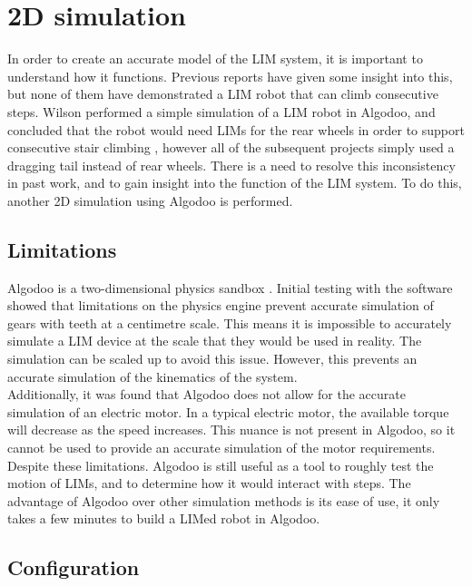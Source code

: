 \chapter{2D simulation}

In order to create an accurate model of the LIM system, it is important to understand how it functions. Previous reports have given some insight into this, but none of them have demonstrated a LIM robot that can climb consecutive steps. Wilson performed a simple simulation of a LIM robot in Algodoo, and concluded that the robot would need LIMs for the rear wheels in order to support consecutive stair climbing \citep{Wilson-2013}, however all of the subsequent projects simply used a dragging tail instead of rear wheels. There is a need to resolve this inconsistency in past work, and to gain insight into the function of the LIM system. To do this, another 2D simulation using Algodoo is performed.

\section{Limitations}

Algodoo is a two-dimensional physics sandbox \citep{Algodoo}. Initial testing with the software showed that limitations on the physics engine prevent accurate simulation of gears with teeth at a centimetre scale. This means it is impossible to accurately simulate a LIM device at the scale that they would be used in reality. The simulation can be scaled up to avoid this issue. However, this prevents an accurate simulation of the kinematics of the system.\\

Additionally, it was found that Algodoo does not allow for the accurate simulation of an electric motor. In a typical electric motor, the available torque will decrease as the speed increases. This nuance is not present in Algodoo, so it cannot be used to provide an accurate simulation of the motor requirements. Despite these limitations. Algodoo is still useful as a tool to roughly test the motion of LIMs, and to determine how it would interact with steps. The advantage of Algodoo over other simulation methods is its ease of use, it only takes a few minutes to build a LIMed robot in Algodoo.

\section{Configuration}


